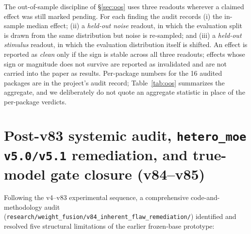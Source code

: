 \documentclass[10pt,twoside]{article}
\theoremstyle{definition}
\theoremstyle{plain}
\theoremstyle{remark}
\begin{document}
The out-of-sample discipline of \S\ref{sec:oos} uses three readouts wherever a claimed effect was still marked pending. For each finding the audit records (i) the in-sample median effect; (ii) a \emph{held-out noise} readout, in which the evaluation split is drawn from the same distribution but noise is re-sampled; and (iii) a \emph{held-out stimulus} readout, in which the evaluation distribution itself is shifted. An effect is reported as \emph{clean} only if the sign is stable across all three readouts; effects whose sign or magnitude does not survive are reported as invalidated and are not carried into the paper as results. Per-package numbers for the 16 audited packages are in the project's audit record; Table~\ref{tab:oos} summarizes the aggregate, and we deliberately do not quote an aggregate statistic in place of the per-package verdicts.

\section{Post-v83 systemic audit, \texttt{hetero\_moe v5.0/v5.1} remediation, and true-model gate closure (v84--v85)}
\label{app:v84}

Following the v4--v83 experimental sequence, a comprehensive code-and-methodology audit (\texttt{research/weight\_fusion/v84\_inherent\_flaw\_remediation/}) identified and resolved five structural limitations of the earlier frozen-base prototype:
\end{document}
